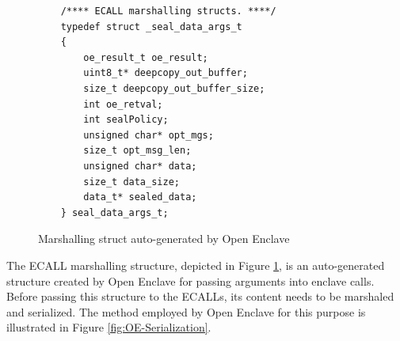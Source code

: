 \documentclass[article, doublespace,nopageskip]{VTthesis} %
\begin{document}
    \begin{figure}
    \begin{tcolorbox}
    \begin{verbatim}
    /**** ECALL marshalling structs. ****/
    typedef struct _seal_data_args_t
    {
        oe_result_t oe_result;
        uint8_t* deepcopy_out_buffer;
        size_t deepcopy_out_buffer_size;
        int oe_retval;
        int sealPolicy;
        unsigned char* opt_mgs;
        size_t opt_msg_len;
        unsigned char* data;
        size_t data_size;
        data_t* sealed_data;
    } seal_data_args_t;
    \end{verbatim}
    \end{tcolorbox}
    \caption{Marshalling struct auto-generated by Open Enclave}
    \label{fig:Marshalling struct}
    \end{figure}


    The ECALL marshalling structure, depicted in Figure \ref{fig:Marshalling struct}, is an auto-generated structure created by Open Enclave for passing arguments into enclave calls. Before passing this structure to the ECALLs, its content needs to be marshaled and serialized. The method employed by Open Enclave for this purpose is illustrated in Figure \ref{fig:OE-Serialization}.
\end{document}
